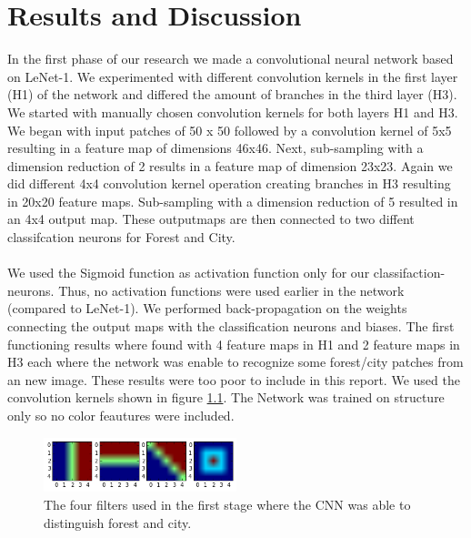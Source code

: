 \documentclass[a4paper,onecolumn]{report}
\begin{document}
\chapter{Results and Discussion}
In the first phase of our research we made a convolutional neural network based on LeNet-1. We experimented with different convolution kernels in the first layer (H1) of the network and differed the amount of branches in the third layer (H3). We started with manually chosen convolution kernels for both layers H1 and H3. We began with input patches of 50 x 50 followed by a convolution kernel of 5x5 resulting in a feature map of dimensions 46x46. Next, sub-sampling with a dimension reduction of 2 results in a feature map of dimension 23x23. Again we did different 4x4 convolution kernel operation creating branches in H3 resulting in 20x20 feature maps. Sub-sampling with a dimension reduction of 5 resulted in an 4x4 output map. These outputmaps are then connected to two diffent classifcation neurons for Forest and City. \\\\
We used the Sigmoid function as activation function only for our classifaction-neurons. Thus, no activation functions were used earlier in the network (compared to LeNet-1). We performed back-propagation on the weights connecting the output maps with the classification neurons and biases. The first functioning results where found with 4 feature maps in H1 and 2 feature maps in H3 each where the network was enable to recognize some forest/city patches from an new image. These results were too poor to include in this report. We used the convolution kernels shown in figure \ref{fig:firstFilters}. The Network was trained on structure only so no color feautures were included. 
\begin{figure}[bth!]
	\centering
	\includegraphics[width=0.5\textwidth]{./images/firstFilters.png}
	\caption{The four filters used in the first stage where the CNN was able to distinguish forest and city.}
	\label{fig:firstFilters}
\end{figure} 
\\\\
\end{document}

